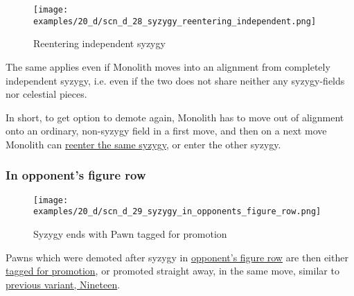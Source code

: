 \clearpage %

\vspace*{-2.3\baselineskip}
\noindent
\begin{figure}[!h]
\texttt{[image: examples/20\_d/scn\_d\_28\_syzygy\_reentering\_independent.png]}
\vspace*{-1.3\baselineskip}
\caption{Reentering independent syzygy}
\label{fig:scn_d_28_syzygy_reentering_independent}
\end{figure}

\vspace*{-0.4\baselineskip}
The same applies even if Monolith moves into an alignment from completely independent
syzygy, i.e. even if the two does not share neither any syzygy-fields nor celestial
pieces.

In short, to get option to demote again, Monolith has to move out of alignment onto
an ordinary, non-syzygy field in a first move, and then on a next move Monolith can
\hyperref[fig:scn_d_26_syzygy_existing]{reenter the same syzygy}, or enter the other
syzygy.

\clearpage %

\subsubsection*{In opponent's figure row}
\label{sec:Discovery/Monolith/Syzygy/In opponent's figure row}

\vspace*{-1.4\baselineskip}
\noindent
\begin{figure}[!h]
\texttt{[image: examples/20\_d/scn\_d\_29\_syzygy\_in\_opponents\_figure\_row.png]}
\vspace*{-1.3\baselineskip}
\caption{Syzygy ends with Pawn tagged for promotion}
\label{fig:scn_d_29_syzygy_in_opponents_figure_row}
\end{figure}

\vspace*{-0.4\baselineskip}
Pawns which were demoted after syzygy in
\hyperref[sec:Terms/Figure row]{opponent's figure row}
are then either \hyperref[sec:Age of Aquarius/Promotion]{tagged for promotion},
or promoted straight away, in the same move, similar to
\hyperref[fig:scn_n_11_teleport_pawns_init]{previous variant, Nineteen}.

